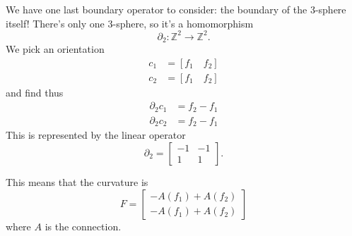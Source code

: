 We have one last boundary operator to consider: the boundary of
the 3-sphere itself! There's only one 3-sphere, so it's a
homomorphism
\begin{equation}%
\partial_{2}:\mathbb{Z}^{2}\to\mathbb{Z}^{2}.
\end{equation}
We pick an orientation
\begin{subequations}
\begin{align}
c_{1} &= [f_{1} \quad f_{2}]\\
c_{2} &= [f_{1} \quad f_{2}]
\end{align}
\end{subequations}
and find thus
\begin{subequations}
\begin{align}
\partial_{2}c_{1} &= f_{2}-f_{1}\\
\partial_{2}c_{2} &= f_{2}-f_{1}
\end{align}
\end{subequations}
This is represented by the linear operator
\begin{equation}%
\partial_{2} = \begin{bmatrix} -1 & -1\\1 & 1\end{bmatrix}.
\end{equation}

This means that the curvature is
\begin{equation}%
F = \begin{bmatrix}-A(f_{1})+A(f_{2})\\ -A(f_{1})+A(f_{2})\end{bmatrix}
\end{equation}
where $A$ is the connection.





